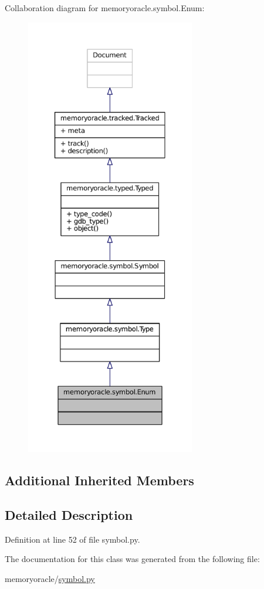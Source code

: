 Collaboration diagram for memoryoracle.\+symbol.\+Enum\+:
\nopagebreak
\begin{figure}[H]
\begin{center}
\leavevmode
\includegraphics[height=550pt]{classmemoryoracle_1_1symbol_1_1Enum__coll__graph}
\end{center}
\end{figure}
\subsection*{Additional Inherited Members}


\subsection{Detailed Description}


Definition at line 52 of file symbol.\+py.



The documentation for this class was generated from the following file\+:\begin{DoxyCompactItemize}
\item 
memoryoracle/\hyperlink{symbol_8py}{symbol.\+py}\end{DoxyCompactItemize}

